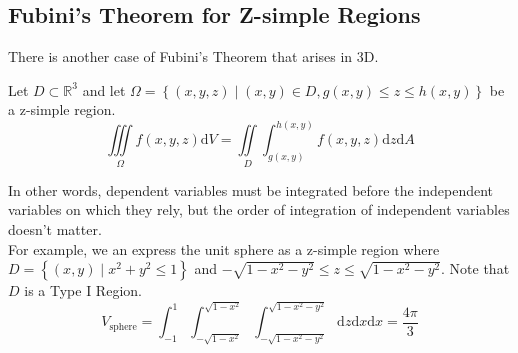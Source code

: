 \subsection{Fubini's Theorem for Z-simple Regions}
\noindent
There is another case of Fubini’s Theorem that arises in 3D.\\
\begin{theorem}
	Let $D \subset \mathbb{R}^3$ and let $\Omega = \left\{(x,y,z) \mid (x,y) \in D, g(x,y) \leq z \leq h(x,y) \right\}$ be a z-simple region.
	\begin{equation*}
		\iiint\limits_{\Omega}{f(x,y,z)\mathrm{d}V} = \iint\limits_{D}{\int_{g(x,y)}^{h(x,y)}{f(x,y,z)\mathrm{d}z}\mathrm{d}A}
	\end{equation*}
\end{theorem}

\noindent
In other words, dependent variables must be integrated before the independent variables on which they rely, but the order of integration of independent variables doesn't matter.\\

\noindent
For example, we an express the unit sphere as a z-simple region where $D = \left\{(x,y) \mid x^2 + y^2 \leq 1\right\}$ and $-\sqrt{1 - x^2 - y^2} \leq z \leq \sqrt{1 - x^2 - y^2}$. Note that $D$ is a Type I Region.
\begin{equation*}
	V_{\text{sphere}} = \int_{-1}^{1}{\int_{-\sqrt{1-x^2}}^{\sqrt{1-x^2}}{\int_{-\sqrt{1-x^2-y^2}}^{\sqrt{1-x^2-y^2}}{\mathrm{d}z}\mathrm{d}x}\mathrm{d}x} = \frac{4\pi}{3}
\end{equation*}